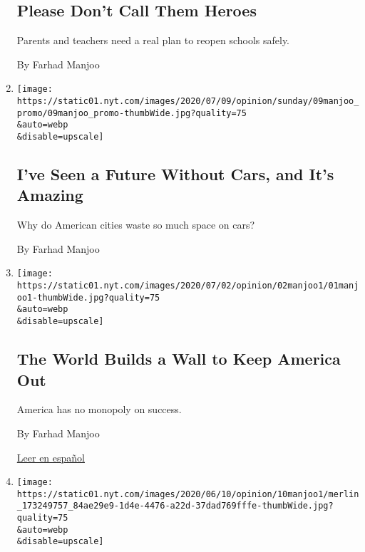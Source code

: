 \begin{enumerate}
  \hypertarget{please-dont-call-them-heroes}{%
  \subsection{Please Don't Call Them
  Heroes}\label{please-dont-call-them-heroes}}

  Parents and teachers need a real plan to reopen schools safely.

  By Farhad Manjoo
\item
  \href{/2020/07/09/opinion/sunday/ban-cars-manhattan-cities.html}{}

  \texttt{[image: https://static01.nyt.com/images/2020/07/09/opinion/sunday/09manjoo\_promo/09manjoo\_promo-thumbWide.jpg?quality=75\\\&auto=webp\\\&disable=upscale]}

  \hypertarget{ive-seen-a-future-without-cars-and-its-amazing}{%
  \subsection{I've Seen a Future Without Cars, and It's
  Amazing}\label{ive-seen-a-future-without-cars-and-its-amazing}}

  Why do American cities waste so much space on cars?

  By Farhad Manjoo
\item
  \href{/2020/07/01/opinion/us-travel-ban-europe.html}{}

  \texttt{[image: https://static01.nyt.com/images/2020/07/02/opinion/02manjoo1/01manjoo1-thumbWide.jpg?quality=75\\\&auto=webp\\\&disable=upscale]}

  \hypertarget{the-world-builds-a-wall-to-keep-america-out}{%
  \subsection{The World Builds a Wall to Keep America
  Out}\label{the-world-builds-a-wall-to-keep-america-out}}

  America has no monopoly on success.

  By Farhad Manjoo

  \href{https://www.nytimes.com/es/2020/07/03/espanol/opinion/prohibicion-viajar-europa.html}{Leer
  en español}
\item
  \href{/2020/06/10/opinion/black-lives-matter-protests.html}{}

  \texttt{[image: https://static01.nyt.com/images/2020/06/10/opinion/10manjoo1/merlin\_173249757\_84ae29e9-1d4e-4476-a22d-37dad769fffe-thumbWide.jpg?quality=75\\\&auto=webp\\\&disable=upscale]}


\end{enumerate}
